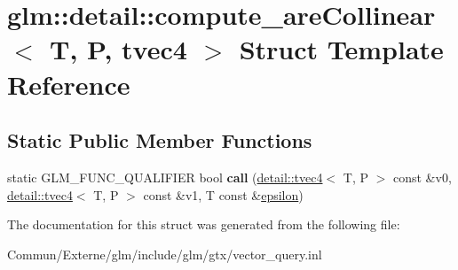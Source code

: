 \hypertarget{structglm_1_1detail_1_1compute__are_collinear_3_01_t_00_01_p_00_01tvec4_01_4}{}\section{glm\+:\+:detail\+:\+:compute\+\_\+are\+Collinear$<$ T, P, tvec4 $>$ Struct Template Reference}
\label{structglm_1_1detail_1_1compute__are_collinear_3_01_t_00_01_p_00_01tvec4_01_4}
\subsection*{Static Public Member Functions}
\begin{DoxyCompactItemize}
\item 
static G\+L\+M\+\_\+\+F\+U\+N\+C\+\_\+\+Q\+U\+A\+L\+I\+F\+I\+ER bool {\bfseries call} (\hyperlink{structglm_1_1detail_1_1tvec4}{detail\+::tvec4}$<$ T, P $>$ const \&v0, \hyperlink{structglm_1_1detail_1_1tvec4}{detail\+::tvec4}$<$ T, P $>$ const \&v1, T const \&\hyperlink{group__gtc__constants_gacb41049b8d22c8aa90e362b96c524feb}{epsilon})\hypertarget{structglm_1_1detail_1_1compute__are_collinear_3_01_t_00_01_p_00_01tvec4_01_4_a4a7e3fba780b73ef237fbf76dc6ead91}{}\label{structglm_1_1detail_1_1compute__are_collinear_3_01_t_00_01_p_00_01tvec4_01_4_a4a7e3fba780b73ef237fbf76dc6ead91}

\end{DoxyCompactItemize}


The documentation for this struct was generated from the following file\+:\begin{DoxyCompactItemize}
\item 
Commun/\+Externe/glm/include/glm/gtx/vector\+\_\+query.\+inl\end{DoxyCompactItemize}
